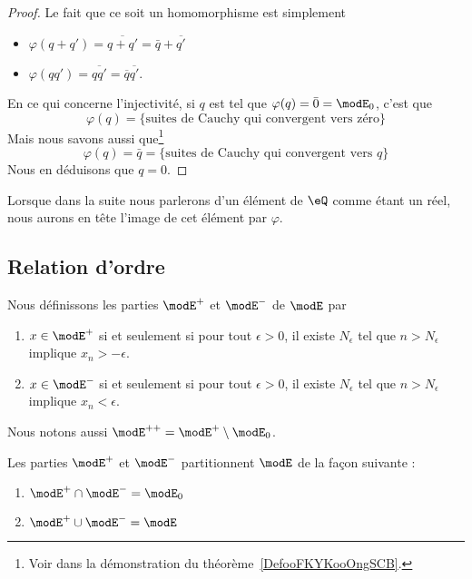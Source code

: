 \begin{proof}
    Le fait que ce soit un homomorphisme est simplement
    \begin{itemize}
        \item \( \varphi(q+q')=\overline{ q+q' }=\bar q+\overline{ q' }\)
        \item \( \varphi(qq')=\overline{ qq' }=\overline{ q }\overline{ q' }\).
    \end{itemize}
    En ce qui concerne l'injectivité, si \( q\) est tel que \( \varphi(q)=\bar 0=\modE_0\), c'est que
    \begin{equation}
        \varphi(q)=\{ \text{suites de Cauchy qui convergent vers zéro} \}
    \end{equation}
    Mais nous savons aussi que\footnote{Voir dans la démonstration du théorème~\ref{DefooFKYKooOngSCB}.}
    \begin{equation}
        \varphi(q)=\bar q=\{ \text{suites de Cauchy qui convergent vers } q \}
    \end{equation}
    Nous en déduisons que \( q=0\).
\end{proof}
Lorsque dans la suite nous parlerons d'un élément de \( \eQ\) comme étant un réel, nous aurons en tête l'image de cet élément par \( \varphi\).

\subsection{Relation d'ordre}

Nous définissons les parties \( \modE^+\) et \( \modE^-\) de \( \modE\) par
\begin{enumerate}
    \item
        \( x\in  \modE^+\) si et seulement si pour tout \( \epsilon>0\), il existe \( N_{\epsilon}\) tel que \( n>N_{\epsilon}\) implique \( x_n>-\epsilon\).
    \item
        \( x\in  \modE^-\) si et seulement si pour tout \( \epsilon>0\), il existe \( N_{\epsilon}\) tel que \( n>N_{\epsilon}\) implique \( x_n<\epsilon\).
\end{enumerate}
Nous notons aussi \( \modE^{++}=\modE^+\setminus\modE_0\).

\begin{lemma}
    Les parties \( \modE^+\) et \( \modE^-\) partitionnent \( \modE\) de la façon suivante :
    \begin{enumerate}
        \item
            \( \modE^+\cap\modE^-=\modE_0\)
        \item
            \( \modE^+\cup\modE^-=\modE\)
    \end{enumerate}
\end{lemma}

